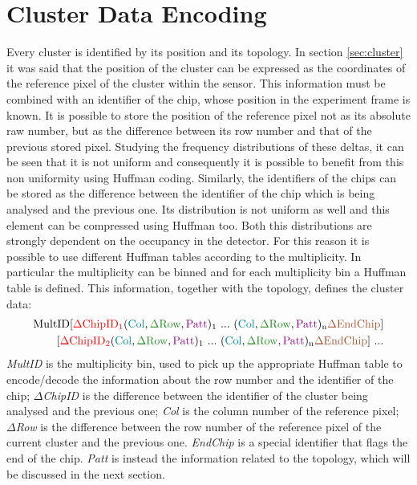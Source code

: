 \section{Cluster Data Encoding}
Every cluster is identified by its position and its topology. In section \ref{sec:cluster} it was said that the position of the cluster can be expressed as the coordinates of the reference pixel of the cluster within the sensor. This information must be combined with an identifier of the chip, whose position in the experiment frame is known. It is possible to store the position of the reference pixel not as its absolute raw number, but as the difference between its row number and that of the previous stored pixel. Studying the frequency distributions of these deltas, it can be seen that it is not uniform and consequently it is possible to benefit from this non uniformity using Huffman coding. Similarly, the identifiers of the chips can be stored as the difference between the identifier of the chip which is being analysed and the previous one. Its distribution is not uniform as well and this element can be compressed using Huffman too. Both this distributions are strongly dependent on the occupancy in the detector. For this reason it is possible to use different Huffman tables according to the multiplicity. In particular the multiplicity can be binned and for each multiplicity bin a Huffman table is defined. This information, together with the topology, defines the cluster data:
\begin{displaymath}
\begin{split}
  \mathrm{MultID[\textcolor{red}{\Delta ChipID_1}(\textcolor{Cerulean}{Col}, \textcolor{LimeGreen}{\Delta Row}, \textcolor{Plum}{Patt})_1 \  ... \ (\textcolor{Cerulean}{Col}, \textcolor{LimeGreen}{\Delta Row}, \textcolor{Plum}{Patt})_n \textcolor{SkyBlue}{\Delta EndChip}] }\\
 \mathrm{[\textcolor{red}{\Delta ChipID_2}(\textcolor{Cerulean}{Col}, \textcolor{LimeGreen}{\Delta Row}, \textcolor{Plum}{Patt})_1 \  ... \ (\textcolor{Cerulean}{Col}, \textcolor{LimeGreen}{\Delta Row}, \textcolor{Plum}{Patt})_n \textcolor{SkyBlue}{\Delta EndChip}]\ ...}
 \end{split}
\end{displaymath}
\textit{MultID} is the multiplicity bin, used to pick up the appropriate Huffman table to encode/decode the information about the row number and the identifier of the chip; \textit{$\Delta$ChipID} is the difference between the identifier of the cluster being analysed and the previous one; \textit{Col} is the column number of the reference pixel; \textit{$\Delta$Row} is the difference between the row number of the reference pixel of the current cluster and the previous one. \textit{EndChip} is a special identifier that flags the end of the chip. \textit{Patt} is instead the information related to the topology, which will be discussed in the next section.
